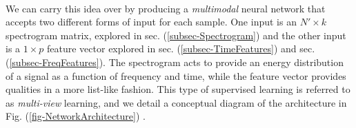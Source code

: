 \documentclass[12pt,letterpaper]{article}
\begin{document}
\paragraph*{}We can carry this idea over by producing a \textit{multimodal} neural network that accepts two different forms of input for each sample. One input is an $N' \times k$ spectrogram matrix, explored in sec. (\ref{subsec-Spectrogram}) and the other input is a $1 \times p$ feature vector explored in sec. (\ref{subsec-TimeFeatures}) and sec. (\ref{subsec-FreqFeatures}). The spectrogram acts to provide an energy distribution of a signal as a function of frequency and time, while the feature vector provides qualities in a more list-like fashion. This type of supervised learning is referred to as \textit{multi-view} learning, and we detail a conceptual diagram of the architecture in Fig. (\ref{fig-NetworkArchitecture}) \cite{Li,Ngiam}.
\end{document}
